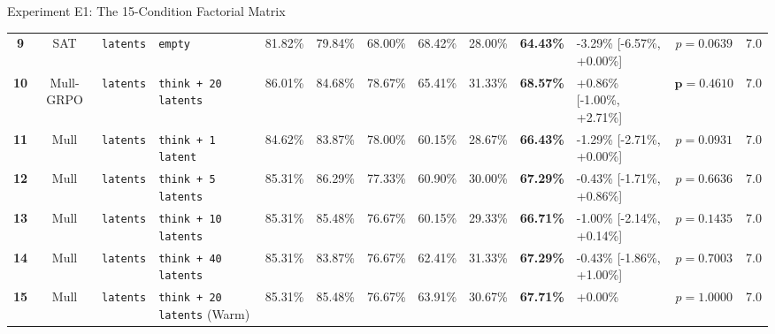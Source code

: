 \documentclass[aspectratio=169, 10pt]{beamer}
\begin{document}
\begin{frame}{Experiment E1: The 15-Condition Factorial Matrix}
{\begin{tabular}{ccllcccccclcc}
    \textbf{9} & SAT & \texttt{latents} & \texttt{empty} & 81.82\% & 79.84\% & 68.00\% & 68.42\% & 28.00\% & \textbf{64.43\%} & -3.29\% [-6.57\%, +0.00\%] & $p = 0.0639$ & 7.0 \\
    \rowcolor{accentlight!30}
    \textbf{10} & Mull-GRPO & \texttt{latents} & \texttt{think + 20 latents} & 86.01\% & 84.68\% & 78.67\% & 65.41\% & 31.33\% & \textbf{68.57\%} & +0.86\% [-1.00\%, +2.71\%] & $\mathbf{p = 0.4610}$ & 7.0 \\
    \textbf{11} & Mull & \texttt{latents} & \texttt{think + 1 latent} & 84.62\% & 83.87\% & 78.00\% & 60.15\% & 28.67\% & \textbf{66.43\%} & -1.29\% [-2.71\%, +0.00\%] & $p = 0.0931$ & 7.0 \\
    \textbf{12} & Mull & \texttt{latents} & \texttt{think + 5 latents} & 85.31\% & 86.29\% & 77.33\% & 60.90\% & 30.00\% & \textbf{67.29\%} & -0.43\% [-1.71\%, +0.86\%] & $p = 0.6636$ & 7.0 \\
    \textbf{13} & Mull & \texttt{latents} & \texttt{think + 10 latents} & 85.31\% & 85.48\% & 76.67\% & 60.15\% & 29.33\% & \textbf{66.71\%} & -1.00\% [-2.14\%, +0.14\%] & $p = 0.1435$ & 7.0 \\
    \textbf{14} & Mull & \texttt{latents} & \texttt{think + 40 latents} & 85.31\% & 83.87\% & 76.67\% & 62.41\% & 31.33\% & \textbf{67.29\%} & -0.43\% [-1.86\%, +1.00\%] & $p = 0.7003$ & 7.0 \\
    \textbf{15} & Mull & \texttt{latents} & \texttt{think + 20 latents} (Warm) & 85.31\% & 85.48\% & 76.67\% & 63.91\% & 30.67\% & \textbf{67.71\%} & +0.00\% & $p = 1.0000$ & 7.0 \\
    \bottomrule
  \end{tabular}}

\end{frame}
\end{document}
